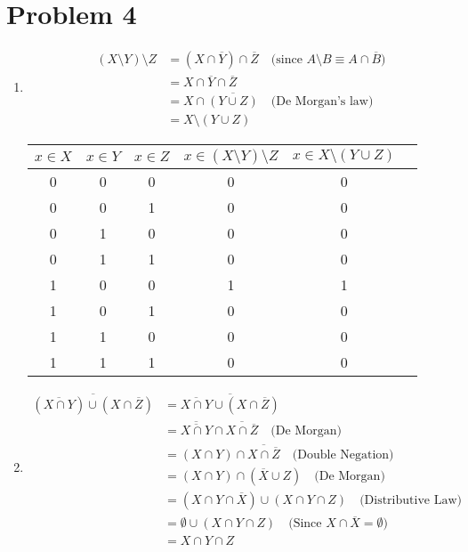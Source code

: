 \documentclass{article}
\begin{document}
\section*{Problem 4}
\begin{enumerate}
    \item %

    \begin{align*}
    (X \setminus Y) \setminus Z 
    &= (X \cap \overline{Y}) \cap \overline{Z} \quad \text{(since } A \setminus B \equiv A \cap \overline{B}) \\
    &= X \cap \overline{Y} \cap \overline{Z} \\
    &= X \cap \overline{(Y \cup Z)} \quad \text{(De Morgan’s law)} \\
    &= X \setminus (Y \cup Z)
    \end{align*}

    \begin{center}
    \renewcommand{\arraystretch}{1.2}
    \begin{tabular}{|c|c|c||c|c|c|}
    \hline
    $x \in X$ & $x \in Y$ & $x \in Z$ & $x \in (X \setminus Y) \setminus Z$ & $x \in X \setminus (Y \cup Z)$ \\
    \hline
    0 & 0 & 0 & 0 & 0 \\
    0 & 0 & 1 & 0 & 0 \\
    0 & 1 & 0 & 0 & 0 \\
    0 & 1 & 1 & 0 & 0 \\
    1 & 0 & 0 & 1 & 1 \\
    1 & 0 & 1 & 0 & 0 \\
    1 & 1 & 0 & 0 & 0 \\
    1 & 1 & 1 & 0 & 0 \\
    \hline
    \end{tabular}
    \end{center}

    \item %
    
    \begin{align*}
    \overline{(\overline{X \cap Y}) \cup (X \cap \overline{Z})}
    &= \overline{\overline{X \cap Y} \cup (X \cap \overline{Z})} \\
    &= \overline{\overline{X \cap Y}} \cap \overline{X \cap \overline{Z}} \quad \text{(De Morgan)} \\
    &= (X \cap Y) \cap \overline{X \cap \overline{Z}} \quad \text{(Double Negation)} \\
    &= (X \cap Y) \cap (\overline{X} \cup Z) \quad \text{(De Morgan)} \\
    &= (X \cap Y \cap \overline{X}) \cup (X \cap Y \cap Z) \quad \text{(Distributive Law)} \\
    &= \emptyset \cup (X \cap Y \cap Z) \quad \text{(Since } X \cap \overline{X} = \emptyset) \\
    &= X \cap Y \cap Z
    \end{align*}


\end{enumerate}
\end{document}
